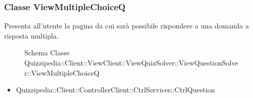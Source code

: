 \subsubsection{Classe ViewMultipleChoiceQ}
Presenta all'utente la pagina da cui sarà possibile rispondere a una domanda a risposta multipla.
\begin{figure}[H]
\centering
\noindent{}
\caption[Schema Classe ViewMultipleChoiceQ]{Schema Classe Quizzipedia::Client::ViewClient::ViewQuizSolver::ViewQuestionSolver::ViewMultipleChoiceQ}
\end{figure}
\begin{itemize}
\item Quizzipedia::Client::ControllerClient::CtrlServices::CtrlQuestion
\end{itemize}
